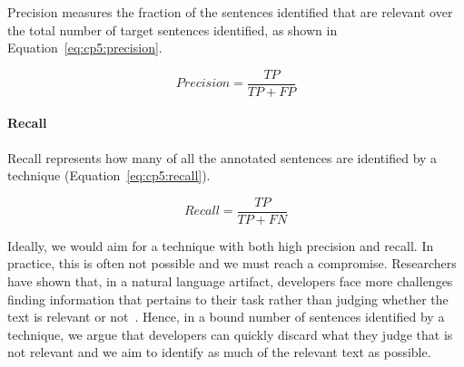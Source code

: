 Precision measures the fraction of the sentences identified that are relevant over the total number of target sentences identified, as shown in Equation~\ref{eq:cp5:precision}.



\begin{equation}
\label{eq:cp5:precision}    
    Precision = \frac{TP}{TP + FP}
\end{equation}



\paragraph{\textbf{Recall}} Recall represents how many of all the annotated sentences are identified by a technique (Equation~\ref{eq:cp5:recall}).


\begin{equation}
\label{eq:cp5:recall}        
    Recall = \frac{TP}{TP + FN}
\end{equation}



\medskip
Ideally, we would aim for a technique with both high precision and recall. In practice, this is often not possible and we must reach a compromise.
Researchers have shown that, in a natural language artifact, developers face more challenges finding information that pertains to their task rather than judging whether the text is relevant or not~\cite{Robillard2015, Maalej2013}. Hence, in a bound number of sentences identified by a technique, we argue that developers can quickly discard what they judge that is not relevant and we aim to identify as much of the relevant text as possible.











